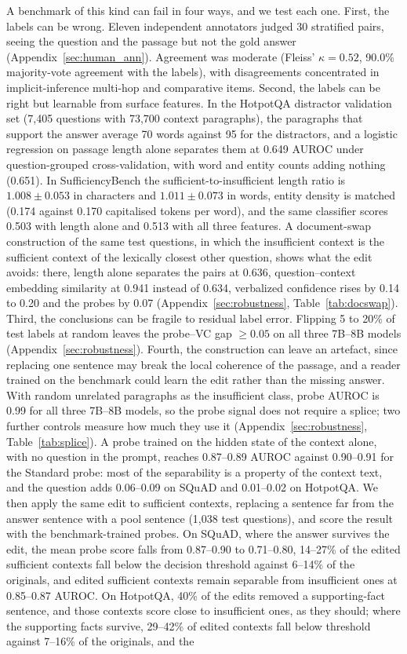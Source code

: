 \documentclass[acmsmall,screen,review]{acmart}
\newcommand{\bench}{SufficiencyBench}
\begin{document}
A benchmark of this kind can fail in four ways, and we test each one. First, the labels can be wrong. Eleven independent annotators judged 30 stratified pairs, seeing the question and the passage but not the gold answer (Appendix~\ref{sec:human_ann}). Agreement was moderate (Fleiss' $\kappa = 0.52$, 90.0\% majority-vote agreement with the labels), with disagreements concentrated in implicit-inference multi-hop and comparative items. Second, the labels can be right but learnable from surface features. In the HotpotQA distractor validation set (7,405 questions with 73,700 context paragraphs), the paragraphs that support the answer average 70 words against 95 for the distractors, and a logistic regression on passage length alone separates them at 0.649 AUROC under question-grouped cross-validation, with word and entity counts adding nothing (0.651). In \bench{} the sufficient-to-insufficient length ratio is $1.008 \pm 0.053$ in characters and $1.011 \pm 0.073$ in words, entity density is matched (0.174 against 0.170 capitalised tokens per word), and the same classifier scores 0.503 with length alone and 0.513 with all three features. A document-swap construction of the same test questions, in which the insufficient context is the sufficient context of the lexically closest other question, shows what the edit avoids: there, length alone separates the pairs at 0.636, question--context embedding similarity at 0.941 instead of 0.634, verbalized confidence rises by 0.14 to 0.20 and the probes by 0.07 (Appendix~\ref{sec:robustness}, Table~\ref{tab:docswap}). Third, the conclusions can be fragile to residual label error. Flipping 5 to 20\% of test labels at random leaves the probe--VC gap $\geq 0.05$ on all three 7B--8B models (Appendix~\ref{sec:robustness}). Fourth, the construction can leave an artefact, since replacing one sentence may break the local coherence of the passage, and a reader trained on the benchmark could learn the edit rather than the missing answer. With random unrelated paragraphs as the insufficient class, probe AUROC is 0.99 for all three 7B--8B models, so the probe signal does not require a splice; two further controls measure how much they use it (Appendix~\ref{sec:robustness}, Table~\ref{tab:splice}). A probe trained on the hidden state of the context alone, with no question in the prompt, reaches 0.87--0.89 AUROC against 0.90--0.91 for the Standard probe: most of the separability is a property of the context text, and the question adds 0.06--0.09 on SQuAD and 0.01--0.02 on HotpotQA. We then apply the same edit to sufficient contexts, replacing a sentence far from the answer sentence with a pool sentence (1,038 test questions), and score the result with the benchmark-trained probes. On SQuAD, where the answer survives the edit, the mean probe score falls from 0.87--0.90 to 0.71--0.80, 14--27\% of the edited sufficient contexts fall below the decision threshold against 6--14\% of the originals, and edited sufficient contexts remain separable from insufficient ones at 0.85--0.87 AUROC. On HotpotQA, 40\% of the edits removed a supporting-fact sentence, and those contexts score close to insufficient ones, as they should; where the supporting facts survive, 29--42\% of edited contexts fall below threshold against 7--16\% of the originals, and the 
\end{document}
